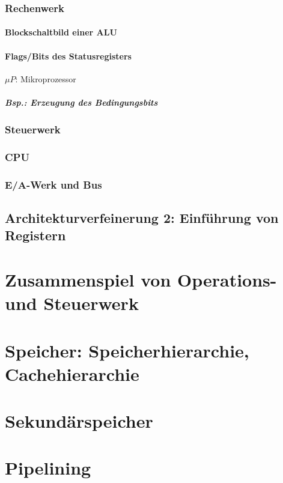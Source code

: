\subsection{Rechenwerk}
\subsubsection{Blockschaltbild einer ALU}
\subsubsection{Flags/Bits des Statusregisters}
$\mu P$: Mikroprozessor
\paragraph{Bsp.: Erzeugung des Bedingungsbits}
\subsection{Steuerwerk}
\subsection{CPU}
\subsection{E/A-Werk und Bus}

\section{Architekturverfeinerung 2: Einführung von Registern}

\chapter{Zusammenspiel von Operations- und Steuerwerk}

\chapter{Speicher: Speicherhierarchie, Cachehierarchie}

\chapter{Sekundärspeicher}

\chapter{Pipelining}

